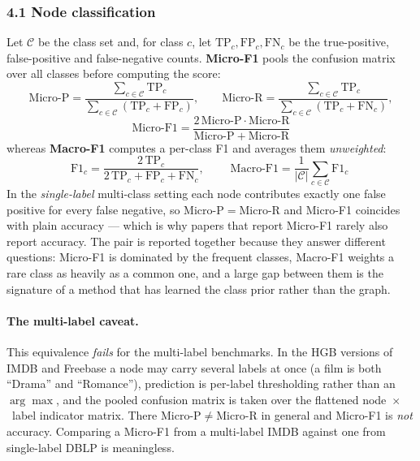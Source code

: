 \subsubsection*{4.1 Node classification}

Let $\mathcal{C}$ be the class set and, for class $c$, let $\mathrm{TP}_c,\mathrm{FP}_c,\mathrm{FN}_c$
be the true-positive, false-positive and false-negative counts. \textbf{Micro-F1} pools the
confusion matrix over all classes before computing the score:
\[
  \mathrm{Micro\text{-}P}=\frac{\sum_{c\in\mathcal{C}}\mathrm{TP}_c}
       {\sum_{c\in\mathcal{C}}\left(\mathrm{TP}_c+\mathrm{FP}_c\right)},\qquad
  \mathrm{Micro\text{-}R}=\frac{\sum_{c\in\mathcal{C}}\mathrm{TP}_c}
       {\sum_{c\in\mathcal{C}}\left(\mathrm{TP}_c+\mathrm{FN}_c\right)},
\]
\[
  \boxed{\;\mathrm{Micro\text{-}F1}
   =\frac{2\,\mathrm{Micro\text{-}P}\cdot \mathrm{Micro\text{-}R}}
          {\mathrm{Micro\text{-}P}+\mathrm{Micro\text{-}R}}\;}
\]
whereas \textbf{Macro-F1} computes a per-class F1 and averages them \emph{unweighted}:
\[
  \mathrm{F1}_c=\frac{2\,\mathrm{TP}_c}{2\,\mathrm{TP}_c+\mathrm{FP}_c+\mathrm{FN}_c},
  \qquad
  \boxed{\;\mathrm{Macro\text{-}F1}=\frac{1}{|\mathcal{C}|}\sum_{c\in\mathcal{C}}\mathrm{F1}_c\;}
\]
In the \emph{single-label} multi-class setting each node contributes exactly one false positive for
every false negative, so $\mathrm{Micro\text{-}P}=\mathrm{Micro\text{-}R}$ and Micro-F1 coincides
with plain accuracy --- which is why papers that report Micro-F1 rarely also report accuracy. The
pair is reported together because they answer different questions: Micro-F1 is dominated by the
frequent classes, Macro-F1 weights a rare class as heavily as a common one, and a large gap between
them is the signature of a method that has learned the class prior rather than the graph.

\paragraph{The multi-label caveat.} This equivalence \emph{fails} for the multi-label benchmarks. In
the HGB versions of IMDB and Freebase a node may carry several labels at once (a film is both
``Drama'' and ``Romance''), prediction is per-label thresholding rather than an $\arg\max$, and the
pooled confusion matrix is taken over the flattened node~$\times$~label indicator matrix. There
$\mathrm{Micro\text{-}P}\neq\mathrm{Micro\text{-}R}$ in general and Micro-F1 is \emph{not} accuracy.
Comparing a Micro-F1 from a multi-label IMDB against one from single-label DBLP is meaningless.

